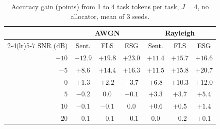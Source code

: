 
\begin{table}[!t]
  \centering
  \caption{Accuracy gain (points) from 1 to 4 task tokens per task,
           $J{=}4$, no allocator, mean of 3 seeds.}
  \label{tab:saturation}
  \footnotesize
  \setlength{\tabcolsep}{4pt}
  \begin{tabular}{rcccccc}
    \toprule
    & \multicolumn{3}{c}{AWGN} & \multicolumn{3}{c}{Rayleigh} \\
    \cmidrule(lr){2-4}\cmidrule(lr){5-7}
    SNR (dB) & Sent. & FLS & ESG & Sent. & FLS & ESG \\
    \midrule
    $-10$ & $+12.9$ & $+19.8$ & $+23.0$ & $+11.4$ & $+15.7$ & $+16.6$ \\
    $-5$  & $+8.6$  & $+14.4$ & $+16.3$ & $+11.5$ & $+15.8$ & $+20.7$ \\
    $0$   & $+1.3$  & $+2.2$  & $+3.7$  & $+6.8$  & $+10.3$ & $+12.0$ \\
    $5$   & $-0.2$  & $0.0$   & $+0.1$  & $+3.3$  & $+3.7$  & $+5.4$ \\
    $10$  & $-0.1$  & $-0.1$  & $0.0$   & $+0.6$  & $+0.5$  & $+1.4$ \\
    $20$  & $-0.1$  & $-0.1$  & $-0.1$  & $0.0$   & $-0.2$  & $+0.1$ \\
    \bottomrule
  \end{tabular}
\end{table}

